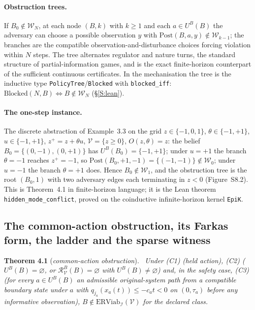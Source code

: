 \documentclass[11pt,a4paper]{article}
\theoremstyle{plain}
\theoremstyle{definition}
\theoremstyle{remark}
\newenvironment{restated}[2]{\par\medskip\noindent\textbf{#1} (\textit{#2}).\ \itshape}{\par\medskip}
\newcommand{\ERViab}{\mathrm{ERViab}}
\newcommand{\cV}{\mathcal{V}}
\newcommand{\cI}{\mathcal{I}}
\newcommand{\cR}{\mathcal{R}}
\newcommand{\cW}{\mathcal{W}}
\newcommand{\Post}{\mathrm{Post}}
\newcommand{\hyp}[1]{\textup{(#1)}}
\begin{document}
\paragraph{Obstruction trees.} If $B_0\notin\cW_N$, at each node $(B,k)$ with $k\ge1$ and each $a\in U^B(B)$ the adversary can choose a possible observation $y$ with $\Post(B,a,y)\notin\cW_{k-1}$; the branches are the compatible observation-and-disturbance choices forcing violation within $N$ steps. The tree alternates regulator and nature turns, the standard structure of partial-information games, and is the exact finite-horizon counterpart of the sufficient continuous certificates. In the mechanisation the tree is the inductive type \texttt{PolicyTree}/\texttt{Blocked} with \texttt{blocked\_iff}: $\mathrm{Blocked}(N,B)\iff B\notin\cW_N$ (\S\ref{S:lean}).

\paragraph{The one-step instance.} The discrete abstraction of Example~3.3 on the grid $z\in\{-1,0,1\}$, $\theta\in\{-1,+1\}$, $u\in\{-1,+1\}$, $z^+=z+\theta u$, $\cV=\{z\ge0\}$, $O(z,\theta)=z$: the belief $B_0=\{(0,-1),(0,+1)\}$ has $U^B(B_0)=\{-1,+1\}$; under $u=+1$ the branch $\theta=-1$ reaches $z^+=-1$, so $\Post(B_0,+1,-1)=\{(-1,-1)\}\notin\cW_0$; under $u=-1$ the branch $\theta=+1$ does. Hence $B_0\notin\cW_1$, and the obstruction tree is the root $(B_0,1)$ with two adversary edges each terminating in $z<0$ (Figure~S8.2). This is Theorem~4.1 in finite-horizon language; it is the Lean theorem \texttt{hidden\_mode\_conflict}, proved on the coinductive infinite-horizon kernel \texttt{EpiK}.

\subsection{The common-action obstruction, its Farkas form, the ladder and the sparse witness}\label{S:common}

\begin{restated}{Theorem 4.1}{common-action obstruction}
Under \hyp{C1} (held action), \hyp{C2} ($U^B(B)=\varnothing$, or $\cR^B_\cV(B)=\varnothing$ with $U^B(B)\ne\varnothing$) and, in the safety case, \hyp{C3} (for every $a\in U^B(B)$ an admissible original-system path from a compatible boundary state under $a$ with $q_{j_a}(x_a(t))\le-c_at<0$ on $(0,\tau_a)$ before any informative observation), $B\notin\ERViab_\cI(\cV)$ for the declared class.
\end{restated}
\end{document}
